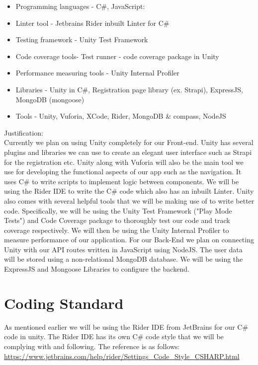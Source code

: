 \documentclass{article}
\begin{document}
\begin{itemize}
  \item Programming languages - C\#, JavaScript:
  \item Linter tool - Jetbrains Rider inbuilt Linter for C\#
  \item Testing framework - Unity Test Framework
  \item Code coverage tools- Test runner - code coverage package in Unity
  \item Performance measuring tools - Unity Internal Profiler
  \item Libraries - Unity in C\#, Registration page library (ex. Strapi), ExpressJS, MongoDB (mongoose) 
  \item Tools - Unity, Vuforia, XCode, Rider, MongoDB \& compass, NodeJS
  \end{itemize}
  Justification: \\
  Currently we plan on using Unity completely for our Front-end. Unity has several plugins and libraries  we can use to create an elegant user interface such as Strapi for the registration etc. Unity along with Vuforia will also be the main tool we use for developing the functional aspects of our app such as the navigation. It uses C\# to write scripts to implement logic between components. We will be using the Rider IDE to write the C\# code which also has an inbuilt Linter. Unity also comes with several helpful tools that we will be making use of to write better code. Specifically, we will be using the Unity Test Framework ("Play Mode Tests") and Code Coverage package to thoroughly test our code and track coverage respectively. We will then be using the Unity Internal Profiler to measure performance of our application. For our Back-End we plan on connecting Unity with our API routes written in JavaScript using NodeJS. The user data will be stored using a non-relational MongoDB database. We will be using the ExpressJS and Mongoose Libraries to configure the backend. 

\section{Coding Standard}

As mentioned earlier we will be using the Rider IDE from JetBrains for our C\# code in unity. The Rider IDE has its own C\# code style that we will be complying with and following. The reference is as follows: \\
\url{https://www.jetbrains.com/help/rider/Settings_Code_Style_CSHARP.html}
\end{document}
